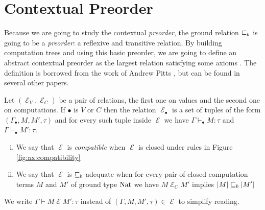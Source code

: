 \section{Contextual Preorder}

Because we are going to study the contextual \emph{preorder},
the ground relation $\sqsubseteq_b$ is going to be a \emph{preorder}: a reflexive 
and transitive relation. By building computation trees and using this basic 
preorder, we are going to define an abstract contextual preorder 
as the largest relation satisfying some axioms \cite{gom} \cite{Ugo2017}.
The definition is borrowed from the work of Andrew Pitts \cite{Pitts2000}, but can be
found in several other papers.

\newcommand{\CE}{\operatorname{\mathcal{E}}}

\begin{adefinition}
    Let $(\CE_V,\CE_C)$ be a pair of relations, the first 
    one on values and the second one on computations.
    If $\bullet$ is $V$ or $C$ then the relation 
    $\CE_\bullet$ is a set of tuples of the form $(\Gamma_\bullet, M,M', \tau)$
    and for every such tuple inside $\CE$ we have 
    $\Gamma \vdash_\bullet M : \tau$ and $\Gamma \vdash_\bullet M' : \tau$. 

    \begin{enumerate}[(i)]
        \item We say that $\CE$ is \emph{compatible} when
            $\CE$ is closed under rules in Figure
            \ref{fig:ax:compatibility}

        \item We say that $\CE$ is $\sqsubseteq_b$-adequate 
            when for every pair of closed computation 
            terms $M$ and $M'$
            of ground type $\textnormal{Nat}$ we have $M \CE_C M'$ 
            implies $|M| \sqsubseteq_b |M'|$
    \end{enumerate}

    We write $\Gamma \vdash M \CE M' : \tau$ 
    instead of $(\Gamma, M, M', \tau) \in \CE$ 
    to simplify reading.
\end{adefinition}

